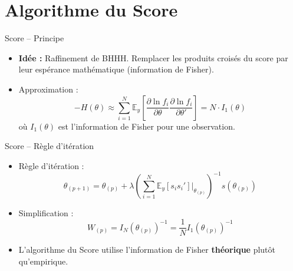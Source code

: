 \documentclass[11pt,aspectratio=169]{beamer}
\begin{document}
\section{Algorithme du Score}

\begin{frame}{Score -- Principe}

\begin{itemize}

\item \textbf{Idée :} Raffinement de BHHH. Remplacer les produits croisés du score par leur espérance mathématique (information de Fisher).\newline

\item Approximation :
  \[
  -H(\theta) \approx \sum_{i=1}^{N} \mathbb{E}_y\left[\frac{\partial \ln f_i}{\partial \theta}\frac{\partial \ln f_i}{\partial \theta'}\right] = N \cdot I_1(\theta)
  \]
  où $I_1(\theta)$ est l'information de Fisher pour une observation.

\end{itemize}

\end{frame}

\begin{frame}{Score -- Règle d'itération}

\begin{itemize}

\item Règle d'itération :
  \[
  \boxed{\theta_{(p+1)} = \theta_{(p)} + \lambda \left(\sum_{i=1}^{N} \mathbb{E}_y\left[s_i s_i'\right]\bigg|_{\theta_{(p)}}\right)^{-1} s(\theta_{(p)})}
  \]

\item Simplification :
  \[
  W_{(p)} = I_N(\theta_{(p)})^{-1} = \frac{1}{N} I_1(\theta_{(p)})^{-1}
  \]

\item L'algorithme du Score utilise l'information de Fisher \textbf{théorique} plutôt qu'empirique.

\end{itemize}

\end{frame}
\end{document}
